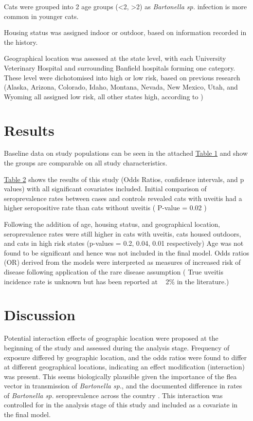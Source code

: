 \documentclass[11pt,twocolumn]{article}
\begin{document}
		Cats were grouped into 2 age groups (\textless 2, \textgreater 2) as \emph{Bartonella sp.} infection is more common in younger cats.


		Housing status was assigned indoor or outdoor, based on information recorded in the history.


		Geographical location was assessed at the state level, with each University Veterinary Hospital and surrounding Banfield hospitals forming one category.
		These level were dichotomised into high or low risk, based on previous research (Alaska, Arizona, Colorado, Idaho, Montana, Nevada, New Mexico, Utah, and Wyoming all assigned low risk, all other states high, according to \cite{Jameson1995a})




\section{Results}


		Baseline data on study populations can be seen in the attached \hyperref[tab:1]{Table 1} and show the groups are comparable on all study characteristics.


		\hyperref[tab:2]{Table 2} shows the results of this study (Odds Ratios, confidence intervals, and p values) with all significant covariates included.
		Initial comparison of seroprevalence rates between cases and controls revealed cats with uveitis had a higher seropositive rate than cats without uveitis ( P-value = 0.02 ) 


		Following the addition of age, housing status, and geographical location, seroprevalence rates were still higher in cats with uveitis, cats housed outdoors, and cats in high risk states (p-values = 0.2, 0.04, 0.01 respectively)
		Age was not found to be significant and hence was not included in the final model.
		Odds ratios (OR) derived from the models were interpreted as measures of increased risk of disease following application of the rare disease assumption ( True uveitis incidence rate is unknown but has been reported at ~ 2\% in the literature.)


\section{Discussion}
		Potential interaction effects of geographic location were proposed at the beginning of the study and assessed during the analysis stage.
		Frequency of exposure differed by geographic location, and the odds ratios were found to differ at different geographical locations, indicating an effect modification (interaction) was present.
		This seems biologically plausible given the importance of the flea vector in transmission of \emph{Bartonella sp.}, and the documented difference in rates of \emph{Bartonella sp.} seroprevalence across the country \cite{Jameson1995a}.
		This interaction was controlled for in the analysis stage of this study and included as a covariate in the final model.
\end{document}
